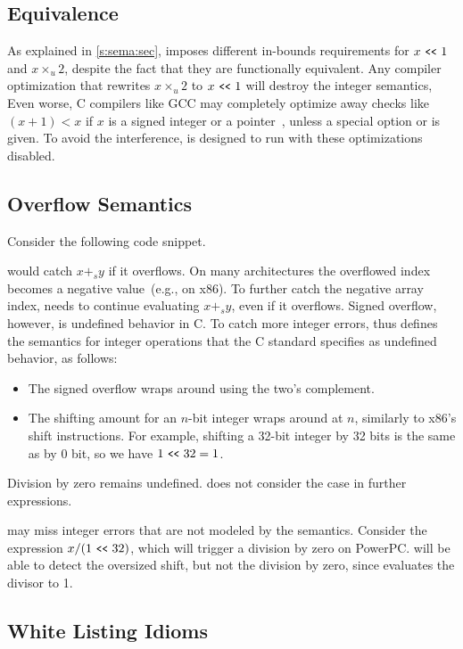 \subsection{Equivalence}
\label{s:sema:eqv}

As explained in \autoref{s:sema:sec}, \sys imposes different in-bounds
requirements for $x \shl 1$ and $x \times_u 2$, despite the fact
that they are functionally equivalent.
Any compiler optimization that rewrites $x \times_u 2$ to $x \shl
1$ will destroy the integer semantics,
%
Even worse, C compilers like GCC may completely
optimize away checks like $(x + 1) < x$ if $x$ is a signed integer
or a pointer~\cite{gcc:signed-overflow,us-cert:gcc}, unless a special
option  or  is
given.  To avoid the interference, \sys is designed to run with
these optimizations disabled.

\subsection{Overflow Semantics}
\label{s:sema:def}

Consider the following code snippet.

\sys would catch $x +_s y$ if it overflows.  On many architectures
the overflowed index becomes a negative value~(e.g., on x86).  To
further catch the negative array index, \sys
needs to continue evaluating $x +_s y$, even if it overflows.
Signed overflow, however, is undefined behavior in C.  To catch
more integer errors, \sys thus defines the semantics for integer
operations that the C standard specifies as undefined behavior, as
follows:
\begin{itemize}
\item
The signed overflow wraps around using the two's complement.
\item
The shifting amount for an $n$-bit integer wraps around at $n$,
similarly to x86's shift instructions.  For example, shifting
a 32-bit integer by 32 bits is the same as by $0$ bit,
so we have $1 \shl 32 = 1$.
\end{itemize}
Division by zero remains undefined.  \sys does not consider the case
in further expressions.

\sys may miss integer errors that are not modeled by the semantics.
Consider the expression $x / (1 \shl 32)$, which will trigger a
division by zero on PowerPC.  \sys will be able to detect the
oversized shift, but not the division by zero, since \sys evaluates
the divisor to 1.

\subsection{White Listing Idioms}
\label{s:sema:whitelist}

